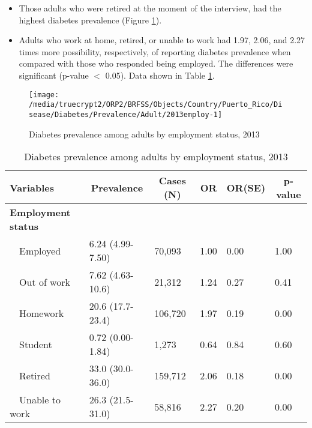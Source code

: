  
 \newpage
\begin{itemize}


\item Those adults who were 
retired at the moment of the interview, had the highest diabetes prevalence (Figure \ref{fig:employ.Diabetes.2013}).

\item Adults who work at home, retired, or unable to work had 1.97, 2.06, and 2.27 times more possibility, respectively, of reporting diabetes prevalence when compared with those who responded being employed. The differences were significant (p-value $<$ 0.05). 
Data shown in Table \ref{tab:employ.Diabetes.2013}.

\end{itemize}

\begin{figure}[H]
\caption{Diabetes prevalence among adults by employment status, 
         2013}
\label{fig:employ.Diabetes.2013}
\begin{knitrout}
\color{fgcolor}

{\centering \texttt{[image: /media/truecrypt2/ORP2/BRFSS/Objects/Country/Puerto\_Rico/Disease/Diabetes/Prevalence/Adult/2013employ-1]} 

}



\end{knitrout}
 \end{figure}

\begin{table}[H]
\caption{Diabetes prevalence  among adults by employment status, 2013\label{tab:employ.Diabetes.2013}} 
\begin{center}
\begin{tabular}{llllll}
\hline\hline
\multicolumn{1}{l}{Variables}&\multicolumn{1}{c}{Prevalence}&\multicolumn{1}{c}{Cases (N)}&\multicolumn{1}{c}{OR}&\multicolumn{1}{c}{OR(SE)}&\multicolumn{1}{c}{p-value}\tabularnewline
\hline
{\bfseries Employment status}&&&&&\tabularnewline
~~Employed&6.24 (4.99-7.50)& 70,093&1.00&0.00&1.00\tabularnewline
~~Out of work&7.62 (4.63-10.6)& 21,312&1.24&0.27&0.41\tabularnewline
~~Homework&20.6 (17.7-23.4)&106,720&1.97&0.19&0.00\tabularnewline
~~Student&0.72 (0.00-1.84)&  1,273&0.64&0.84&0.60\tabularnewline
~~Retired&33.0 (30.0-36.0)&159,712&2.06&0.18&0.00\tabularnewline
~~Unable to work&26.3 (21.5-31.0)& 58,816&2.27&0.20&0.00\tabularnewline
\hline
\end{tabular}\end{center}

\end{table}


